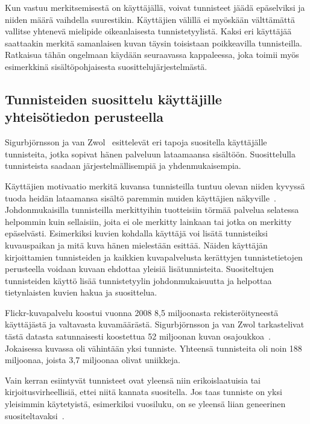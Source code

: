 \documentclass[12pt,finnish]{tktltiki2}
\theoremstyle{definition}
\theoremstyle{remark}
\begin{document}
Kun vastuu merkitsemisestä on käyttäjällä, voivat tunnisteet jäädä epäselviksi ja niiden määrä vaihdella suurestikin. Käyttäjien välillä ei myöskään välttämättä vallitse yhtenevä mielipide oikeanlaisesta tunnistetyylistä. Kaksi eri käyttäjää saattaakin merkitä samanlaisen kuvan täysin toisistaan poikkeavilla tunnisteilla. Ratkaisua tähän ongelmaan käydään seuraavassa kappaleessa, joka toimii myös esimerkkinä sisältöpohjaisesta suosittelujärjestelmästä.


\subsection{Tunnisteiden suosittelu käyttäjille yhteisötiedon perusteella}

Sigurbjörnsson ja van Zwol~\cite{Sigurbjornsson:2008:FTR:1367497.1367542} esittelevät eri tapoja suositella käyttäjälle tunnisteita, jotka sopivat hänen palveluun lataamaansa sisältöön. Suosittelulla tunnisteista saadaan järjestelmällisempiä ja yhdenmukaisempia.

Käyttäjien motivaatio merkitä kuvansa tunnisteilla tuntuu olevan niiden kyvyssä tuoda heidän lataamansa sisältö paremmin muiden käyttäjien näkyville~\cite{Ames:2007:WWT:1240624.1240772}. Johdonmukaisilla tunnisteilla merkittyihin tuotteisiin törmää palvelua selatessa helpommin kuin sellaisiin, joita ei ole merkitty lainkaan tai jotka on merkitty epäselvästi. Esimerkiksi kuvien kohdalla käyttäjä voi lisätä tunnisteiksi kuvauspaikan ja mitä kuva hänen mielestään esittää. Näiden käyttäjän kirjoittamien tunnisteiden ja kaikkien kuvapalvelusta kerättyjen tunnistetietojen perusteella voidaan kuvaan ehdottaa yleisiä lisätunnisteita. Suositeltujen tunnisteiden käyttö lisää tunnistetyylin johdonmukaisuutta ja helpottaa tietynlaisten kuvien hakua ja suosittelua.

Flickr-kuvapalvelu koostui vuonna 2008 8,5 miljoonasta rekisteröityneestä käyttäjästä ja valtavasta kuvamäärästä. Sigurbjörnsson ja van Zwol tarkastelivat tästä datasta satunnaisesti koostettua 52 miljoonan kuvan osajoukkoa~\cite{Sigurbjornsson:2008:FTR:1367497.1367542}. Jokaisessa kuvassa oli vähintään yksi tunniste. Yhteensä tunnisteita oli noin 188 miljoonaa, joista 3,7 miljoonaa olivat uniikkeja.

	Vain kerran esiintyvät tunnisteet ovat yleensä niin erikoislaatuisia tai kirjoitusvirheellisiä, ettei niitä kannata suositella. Jos taas tunniste on yksi yleisimmin käytetyistä, esimerkiksi vuosiluku, on se yleensä liian geneerinen suositeltavaksi~\cite{Sigurbjornsson:2008:FTR:1367497.1367542}.
	
\end{document}
